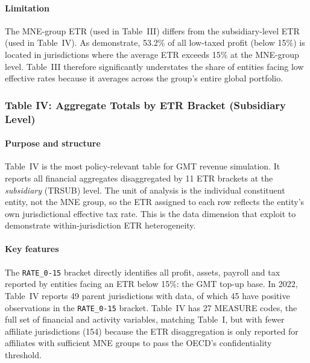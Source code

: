 \documentclass[11pt,a4paper]{article}
\newcommand{\code}[1]{\texttt{#1}}
\begin{document}
\paragraph{Limitation}
The MNE-group ETR (used in Table~III) differs from the subsidiary-level ETR (used in Table~IV). As \citet{hugger2025} demonstrate, 53.2\% of all low-taxed profit (below 15\%) is located in jurisdictions where the average ETR exceeds 15\% at the MNE-group level. Table~III therefore significantly understates the share of entities facing low effective rates because it averages across the group's entire global portfolio.

\subsubsection{Table IV: Aggregate Totals by ETR Bracket (Subsidiary Level)}\label{sec:table4}

\paragraph{Purpose and structure}
Table~IV is the most policy-relevant table for GMT revenue simulation. It reports all financial aggregates disaggregated by 11 ETR brackets at the \emph{subsidiary} (TRSUB) level. The unit of analysis is the individual constituent entity, not the MNE group, so the ETR assigned to each row reflects the entity's own jurisdictional effective tax rate. This is the data dimension that \citet{hugger2025} exploit to demonstrate within-jurisdiction ETR heterogeneity.

\paragraph{Key features}
The \code{RATE\_0-15} bracket directly identifies all profit, assets, payroll and tax reported by entities facing an ETR below 15\%: the GMT top-up base. In 2022, Table~IV reports 49 parent jurisdictions with data, of which 45 have positive observations in the \code{RATE\_0-15} bracket. Table~IV has 27 MEASURE codes, the full set of financial and activity variables, matching Table~I, but with fewer affiliate jurisdictions (154) because the ETR disaggregation is only reported for affiliates with sufficient MNE groups to pass the OECD's confidentiality threshold.
\end{document}
